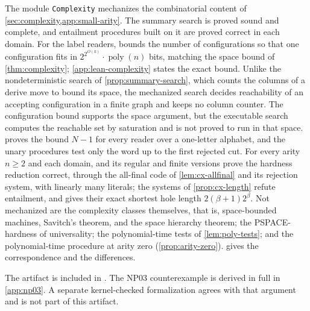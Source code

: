 The module \texttt{Complexity} mechanizes the combinatorial content of
\cref{sec:complexity,app:small-arity}. The summary search is proved sound
and complete, and entailment procedures built on it are proved correct in
each domain. For the label readers,
 bounds the number of
configurations so that one configuration fits in
$2^{2^{O(k)}}\cdot\operatorname{poly}(n)$ bits, matching the space bound of
\cref{thm:complexity}; \cref{app:lean-complexity} states the exact bound.
Unlike the nondeterministic search of \cref{prop:summary-search}, which
counts the columns of a derive move to bound its space, the mechanized search
decides reachability of an accepting configuration in a finite graph and
keeps no column counter. The configuration bound supports the space
argument, but the executable search computes the reachable set by
saturation and is not proved to run in that space.
 proves the bound $N-1$ for every
reader over a one-letter alphabet, and the unary procedures test only the
word up to the first rejected cut. For every arity $n\ge2$ and each domain,
 and its regular and finite
versions prove the hardness reduction correct, through the all-final code
of \cref{lem:cx-allfinal} and its rejection system, with linearly many
literals;
the systems of \cref{prop:cx-length} refute entailment, and
 gives their exact shortest hole
length $2(\beta+1)2^\beta$. Not mechanized are the complexity classes
themselves, that is, space-bounded machines, Savitch's theorem, and the
space hierarchy theorem; the PSPACE-hardness of universality; the
polynomial-time tests of \cref{lem:poly-tests}; and the polynomial-time
procedure at arity zero (\cref{prop:arity-zero}).
 gives the correspondence and the differences.

The artifact is included in
.
The NP03 counterexample is derived in full in \cref{app:np03}. A separate
kernel-checked formalization agrees with that argument and is not part
of this artifact.
